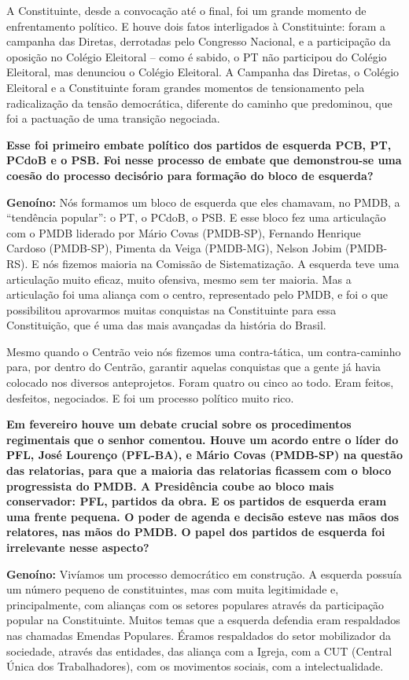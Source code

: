 A Constituinte, desde a convocação até o final, foi um grande momento de
enfrentamento político. E houve dois fatos interligados à Constituinte:
foram a campanha das Diretas, derrotadas pelo Congresso Nacional, e a
participação da oposição no Colégio Eleitoral -- como é sabido, o PT não
participou do Colégio Eleitoral, mas denunciou o Colégio Eleitoral. A
Campanha das Diretas, o Colégio Eleitoral e a Constituinte foram grandes
momentos de tensionamento pela radicalização da tensão democrática,
diferente do caminho que predominou, que foi a pactuação de uma
transição negociada.

\textbf{Esse foi primeiro embate político dos partidos de esquerda PCB,
PT, PCdoB e o PSB. Foi nesse processo de embate que demonstrou-se uma
coesão do processo decisório para formação do bloco de esquerda?}

\textbf{Genoíno:} Nós formamos um bloco de esquerda que eles chamavam,
no PMDB, a ``tendência popular'': o PT, o PCdoB, o PSB. E esse bloco fez
uma articulação com o PMDB liderado por Mário Covas (PMDB-SP), Fernando
Henrique Cardoso (PMDB-SP), Pimenta da Veiga (PMDB-MG), Nelson Jobim
(PMDB-RS). E nós fizemos maioria na Comissão de Sistematização. A
esquerda teve uma articulação muito eficaz, muito ofensiva, mesmo sem
ter maioria. Mas a articulação foi uma aliança com o centro,
representado pelo PMDB, e foi o que possibilitou aprovarmos muitas
conquistas na Constituinte para essa Constituição, que é uma das mais
avançadas da história do Brasil.

Mesmo quando o Centrão veio nós fizemos uma contra-tática, um
contra-caminho para, por dentro do Centrão, garantir aquelas conquistas
que a gente já havia colocado nos diversos anteprojetos. Foram quatro ou
cinco ao todo. Eram feitos, desfeitos, negociados. E foi um processo
político muito rico.

\textbf{Em fevereiro houve um debate crucial sobre os procedimentos
regimentais que o senhor comentou. Houve um acordo entre o líder do PFL,
José Lourenço (PFL-BA), e Mário Covas (PMDB-SP) na questão das
relatorias, para que a maioria das relatorias ficassem com o bloco
progressista do PMDB. A Presidência coube ao bloco mais conservador:
PFL, partidos da obra. E os partidos de esquerda eram uma frente
pequena. O poder de agenda e decisão esteve nas mãos dos relatores, nas
mãos do PMDB. O papel dos partidos de esquerda foi irrelevante nesse
aspecto?}

\textbf{Genoíno:} Vivíamos um processo democrático em construção. A
esquerda possuía um número pequeno de constituintes, mas com muita
legitimidade e, principalmente, com alianças com os setores populares
através da participação popular na Constituinte. Muitos temas que a
esquerda defendia eram respaldados nas chamadas Emendas Populares.
Éramos respaldados do setor mobilizador da sociedade, através das
entidades, das aliança com a Igreja, com a CUT (Central Única dos
Trabalhadores), com os movimentos sociais, com a intelectualidade.

